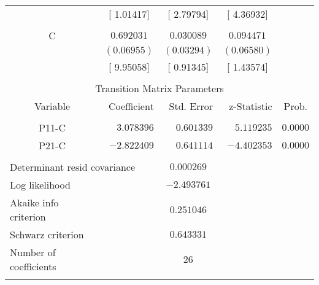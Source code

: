 \begin{tabular}{lrrrr}
\multicolumn{1}{c}{}&\multicolumn{1}{c}{[ 1.01417]}&\multicolumn{1}{c}{[ 2.79794]}&\multicolumn{1}{c}{[ 4.36932]}&\multicolumn{1}{c}{}\\
\multicolumn{1}{c}{}&\multicolumn{1}{c}{}&\multicolumn{1}{c}{}&\multicolumn{1}{c}{}&\multicolumn{1}{c}{}\\
\multicolumn{1}{c}{C}&\multicolumn{1}{c}{$0.692031$}&\multicolumn{1}{c}{$0.030089$}&\multicolumn{1}{c}{$0.094471$}&\multicolumn{1}{c}{}\\
\multicolumn{1}{c}{}&\multicolumn{1}{c}{$(0.06955)$}&\multicolumn{1}{c}{$(0.03294)$}&\multicolumn{1}{c}{$(0.06580)$}&\multicolumn{1}{c}{}\\
\multicolumn{1}{c}{}&\multicolumn{1}{c}{[ 9.95058]}&\multicolumn{1}{c}{[ 0.91345]}&\multicolumn{1}{c}{[ 1.43574]}&\multicolumn{1}{c}{}\\
[4.5pt] \hline \\ [-4.5pt]
\multicolumn{5}{c}{Transition Matrix Parameters}\\
\multicolumn{1}{c}{Variable}&\multicolumn{1}{r}{Coefficient}&\multicolumn{1}{r}{Std. Error}&\multicolumn{1}{r}{z-Statistic}&\multicolumn{1}{c}{Prob.}\\
[4.5pt] \hline \\ [-4.5pt]
\multicolumn{1}{c}{P11-C}&\multicolumn{1}{r}{$3.078396$}&\multicolumn{1}{r}{$0.601339$}&\multicolumn{1}{r}{$5.119235$}&\multicolumn{1}{c}{$0.0000$}\\
\multicolumn{1}{c}{P21-C}&\multicolumn{1}{r}{$-2.822409$}&\multicolumn{1}{r}{$0.641114$}&\multicolumn{1}{r}{$-4.402353$}&\multicolumn{1}{c}{$0.0000$}\\
[4.5pt] \hline \\ [-4.5pt]
\multicolumn{2}{l}{Determinant resid covariance}&\multicolumn{1}{c}{$0.000269$}&\multicolumn{1}{c}{}&\multicolumn{1}{c}{}\\
\multicolumn{1}{l}{Log likelihood}&\multicolumn{1}{c}{}&\multicolumn{1}{c}{$-2.493761$}&\multicolumn{1}{c}{}&\multicolumn{1}{c}{}\\
\multicolumn{1}{l}{Akaike info criterion}&\multicolumn{1}{c}{}&\multicolumn{1}{c}{$0.251046$}&\multicolumn{1}{c}{}&\multicolumn{1}{c}{}\\
\multicolumn{1}{l}{Schwarz criterion}&\multicolumn{1}{c}{}&\multicolumn{1}{c}{$0.643331$}&\multicolumn{1}{c}{}&\multicolumn{1}{c}{}\\
\multicolumn{1}{l}{Number of coefficients}&\multicolumn{1}{c}{}&\multicolumn{1}{c}{$26$}&\multicolumn{1}{c}{}&\multicolumn{1}{c}{}\\
[4.5pt] \hline \\ [-4.5pt]
\end{tabular}

